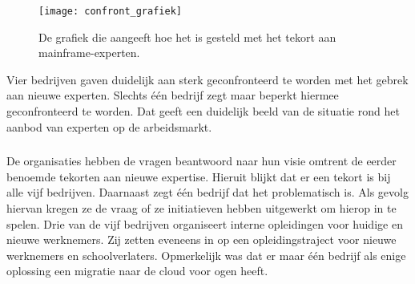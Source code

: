  \begin{figure}[h]
     \centering
     \texttt{[image: confront\_grafiek]}
     \caption{De grafiek die aangeeft hoe het is gesteld met het tekort aan mainframe-experten.}
 \end{figure}

Vier bedrijven gaven duidelijk aan sterk geconfronteerd te worden met het gebrek aan nieuwe experten. Slechts één bedrijf zegt maar beperkt hiermee geconfronteerd te worden. Dat geeft een duidelijk beeld van de situatie rond het aanbod van experten op de arbeidsmarkt.

 \subsubsection{}
\label{sec:Wat is de visie van de bevraagde bedrijven rond expertise en welke initiatieve zetten ze hiervoor op?}

De organisaties hebben de vragen beantwoord naar hun visie omtrent de eerder benoemde tekorten aan nieuwe expertise. Hieruit blijkt dat er een tekort is bij alle vijf bedrijven. Daarnaast zegt één bedrijf dat het problematisch is. Als gevolg hiervan kregen ze de vraag of ze initiatieven hebben uitgewerkt om hierop in te spelen. Drie van de vijf bedrijven organiseert interne opleidingen voor huidige en nieuwe werknemers. Zij zetten eveneens in op een opleidingstraject voor nieuwe werknemers en schoolverlaters. Opmerkelijk was dat er maar één bedrijf als enige oplossing een migratie naar de cloud voor ogen heeft. 

\newpage

\subsubsection{}
\label{sec:Welke nadelen brengt het gebruik van een mainframe mee voor de organisatie?}

